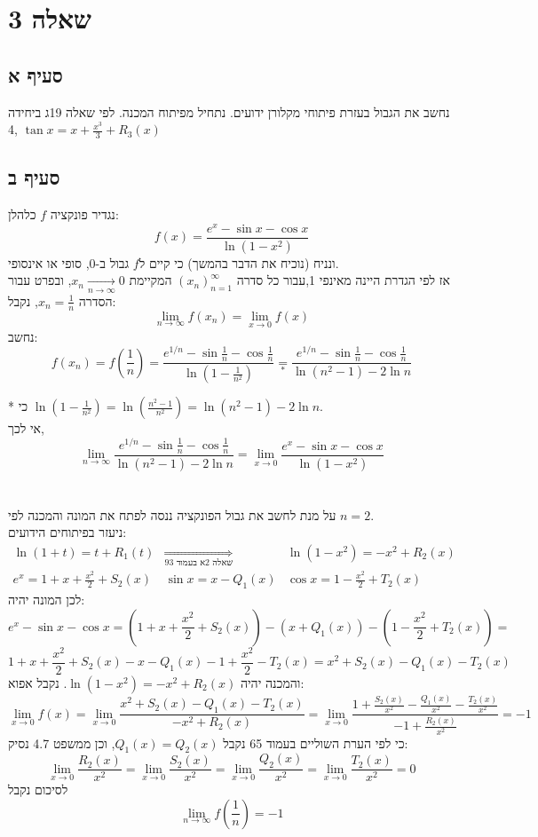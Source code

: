 \documentclass{article}
\newcommand\underrel[2]{\mathrel{\mathop{#2}\limits_{#1}}}
\begin{document}
\pagebreak

\section*{שאלה 3}

\subsection*{סעיף א}

נחשב את הגבול בעזרת פיתוחי מקלורן ידועים. נתחיל מפיתוח המכנה.
לפי שאלה 19ג ביחידה 4, $\tan x = x + \frac{x^3}{3}+R_3(x)$

\subsection*{סעיף ב}

נגדיר פונקציה $f$ כלהלן:
\[
    f(x)=\frac{e^x -\sin x-\cos x}{\ln(1-x^2)}
\]
ונניח (נוכיח את הדבר בהמשך) כי קיים ל$f$ גבול ב-0, סופי או אינסופי. \\
אז לפי הגדרת היינה מאינפי 1,עבור כל סדרה $(x_n)_{n=1}^\infty$ המקיימת $x_n\xrightarrow[n\rightarrow \infty]{} 0$,
ובפרט עבור הסדרה $x_n=\frac{1}{n}$,
נקבל:
\[
    \lim_{n\rightarrow \infty}f(x_n)=\lim_{x\rightarrow 0}f(x)
\]
נחשב:
\[
    f(x_n)=
    f(\frac{1}{n})=
    \frac{e^{1/n} -\sin \frac{1}{n} -\cos \frac{1}{n}}{\ln(1-\frac{1}{n^2})} \underrel{\ast}{=}
    \frac{e^{1/n} -\sin \frac{1}{n} -\cos \frac{1}{n}}{\ln(n^2-1)-2\ln n}
\]

* כי $\ln(1-\frac{1}{n^2}) = \ln(\frac{n^2-1}{n^2})=\ln(n^2-1)-2\ln n$. \\
אי לכך,
\[
    \lim_{n\rightarrow\infty} \frac{e^{1/n} -\sin \frac{1}{n} -\cos \frac{1}{n}}{\ln(n^2-1)-2\ln n} =
    \lim_{x\rightarrow 0} \frac{e^x -\sin x-\cos x}{\ln(1-x^2)}
\]
\\\\
על מנת לחשב את גבול הפונקציה ננסה לפתח את המונה והמכנה לפי $n=2$. \\
ניעזר בפיתוחים הידועים:
\[
    \begin{matrix}
        \ln(1+t) = t + R_1(t)               & \underrel{\text{שאלה 2א בעמוד 93}}{\Rightarrow} & \ln(1-x^2)=-x^2+R_2(x) \\
        e^x = 1 + x + \frac{x^2}{2}+ S_2(x) &
        \sin x = x - Q_1(x)                 &
        \cos x = 1 - \frac{x^2}{2} + T_2(x)
    \end{matrix}
\]
לכן המונה יהיה:
\[
    e^x-\sin x - \cos x =
    (1 + x + \frac{x^2}{2}+ S_2(x)) - (x + Q_1(x)) - (1 - \frac{x^2}{2} + T_2(x)) =
\]
\[
    1+x+\frac{x^2}{2}+ S_2(x) - x - Q_1(x) - 1 + \frac{x^2}{2} - T_2(x)=
    x^2+S_2(x)-Q_1(x)-T_2(x)
\]
והמכנה יהיה $\ln(1-x^2)=-x^2+R_2(x)$. נקבל אפוא:
\[
    \lim_{x\rightarrow 0} f(x) =
    \lim_{x\rightarrow 0} \frac{x^2+S_2(x)-Q_1(x)-T_2(x)}{-x^2+R_2(x)} =
    \lim_{x\rightarrow 0} \frac{1+\frac{S_2(x)}{x^2}-\frac{Q_1(x)}{x^2}-\frac{T_2(x)}{x^2}}{-1+\frac{R_2(x)}{x^2}} = -1
\]
כי לפי הערת השוליים בעמוד 65 נקבל $Q_1(x)=Q_2(x)$, וכן ממשפט 4.7 נסיק:
\[
    \lim_{x\rightarrow 0} \frac{R_2(x)}{x^2} =
    \lim_{x\rightarrow 0} \frac{S_2(x)}{x^2} =
    \lim_{x\rightarrow 0} \frac{Q_2(x)}{x^2} =
    \lim_{x\rightarrow 0} \frac{T_2(x)}{x^2} = 0
\]
לסיכום נקבל
\[
    \lim_{n\rightarrow \infty} f(\frac{1}{n}) = -1
\]
\end{document}
